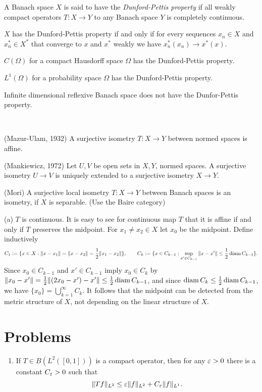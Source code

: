 \documentclass{../../large}
\begin{document}
\begin{prb}
A Banach space $X$ is said to have the \emph{Dunford-Pettis property} if all weakly compact operators $T:X\to Y$ to any Banach space $Y$ is completely continuous.
\begin{parts}
\item $X$ has the Dunford-Pettis property if and only if for every sequences $x_n\in X$ and $x^*_n\in X^*$ that converge to $x$ and $x^*$ weakly we have $x^*_n(x_n)\to x^*(x)$.
\item $C(\Omega)$ for a compact Hausdorff space $\Omega$ has the Dunford-Pettis property.
\item $L^1(\Omega)$ for a probability space $\Omega$ has the Dunford-Pettis property.
\item Infinite dimensional reflexive Banach space does not have the Dunfor-Pettis property.
\end{parts}
\end{prb}


\begin{prb}\,
\begin{parts}
\item (Mazur-Ulam, 1932) A surjective isometry $T:X\to Y$ between normed spaces is affine.
\item (Mankiewicz, 1972) Let $U,V$ be open sets in $X,Y$, normed spaces. A surjective isometry $U\to V$ is uniquely extended to a surjective isometry $X\to Y$.
\item (Mori) A surjective local isometry $T:X\to Y$ between Banach spaces is an isometry, if $X$ is separable. (Use the Baire category)
\end{parts}
\end{prb}
\begin{sol}
(a)
$T$ is continuous.
It is easy to see for continuous map $T$ that it is affine if and only if $T$ preserves the midpoint.
For $x_1\ne x_2\in X$ let $x_0$ be the midpoint.
Define inductively
\[C_1:=\{x\in X:\|x-x_1\|=\|x-x_2\|=\frac12\|x_1-x_2\|\},\qquad C_k:=\{x\in C_{k-1}:\sup_{x'\in C_{k-1}}\|x-x'\|\le\frac12\operatorname{diam} C_{k-1}\}.\]
Since $x_0\in C_{k-1}$ and $x'\in C_{k-1}$ imply $x_0\in C_k$ by $\|x_0-x'\|=\frac12\|(2x_0-x')-x'\|\le\frac12\operatorname{diam} C_{k-1}$, and since $\operatorname{diam} C_k\le\frac12\operatorname{diam} C_{k-1}$, we have $\{x_0\}=\bigcup_{k=1}^\infty C_k$.
It follows that the midpoint can be detected from the metric structure of $X$, not depending on the linear structure of $X$.
\end{sol}


\section*{Problems}
\begin{enumerate}
\item If $T\in B(L^2([0,1]))$ is a compact operator, then for any $\varepsilon>0$ there is a constant $C_\varepsilon>0$ such that
\[\|Tf\|_{L^2}\le\varepsilon\|f\|_{L^2}+C_\varepsilon\|f\|_{L^1}.\]
\end{enumerate}
\end{document}
